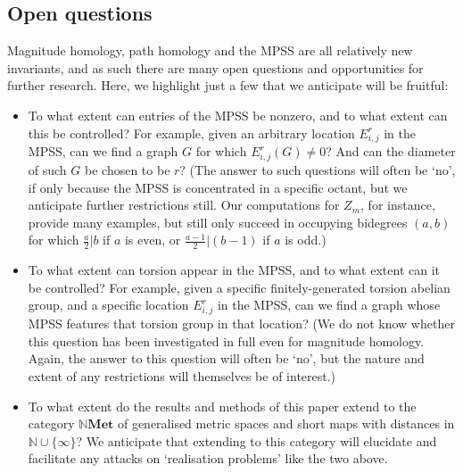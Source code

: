 \documentclass[a4paper, 11 pt, oneside, reqno]{amsart}
\numberwithin{lemma}{section}
\theoremstyle{definition}
\newcommand{\cn}[1]{\mathbf{#1}}
\newcommand{\NMet}{\mathbb{N}\cn{Met}}
\begin{document}
\subsection*{Open questions}
Magnitude homology, path homology and the MPSS
are all relatively new invariants, and as such there
are many open questions and opportunities for 
further research.  
Here, we highlight just a few that we anticipate will
be fruitful:
\begin{itemize}
    \item To what extent can entries of the MPSS be nonzero, 
    and to what extent can this be controlled?
    For example, given an arbitrary location $E^r_{i,j}$ in the MPSS, 
    can we find a graph $G$ for which $E^r_{i,j}(G)\neq 0$? 
    And can the diameter of such $G$ be chosen to be $r$?
    (The answer to such questions will often be `no',
    if only because the MPSS is concentrated in a specific octant,
    but we anticipate further restrictions still.
    Our computations for $Z_m$, for instance, provide many examples,
    but still only succeed in occupying bidegrees $(a,b)$ for which
    $\frac{a}{2}|b$ if $a$ is even, or $\frac{a-1}{2}|(b-1)$ if $a$ is odd.)
    
    \item To what extent can torsion appear in the MPSS, 
    and to what extent can it be controlled?  
    For example, 
    given a specific finitely-generated torsion abelian group,
    and a specific location $E^r_{i,j}$ in the MPSS,
    can we find a graph whose MPSS features that torsion 
    group in that location?
    (We do not know whether this question has been investigated in full
    even for magnitude homology.
    Again, the answer to this question will often be `no',
    but the nature and extent of any restrictions will 
    themselves be of interest.)
    \item To what extent do the results and methods of this paper 
    extend to the category $\NMet$ of generalised metric spaces
    and short maps with distances in $\mathbb{N}\cup\{\infty\}$?
    We anticipate that extending to this category will elucidate and
    facilitate any attacks on `realisation problems'
    like the two above.
    

\end{itemize}
\end{document}
